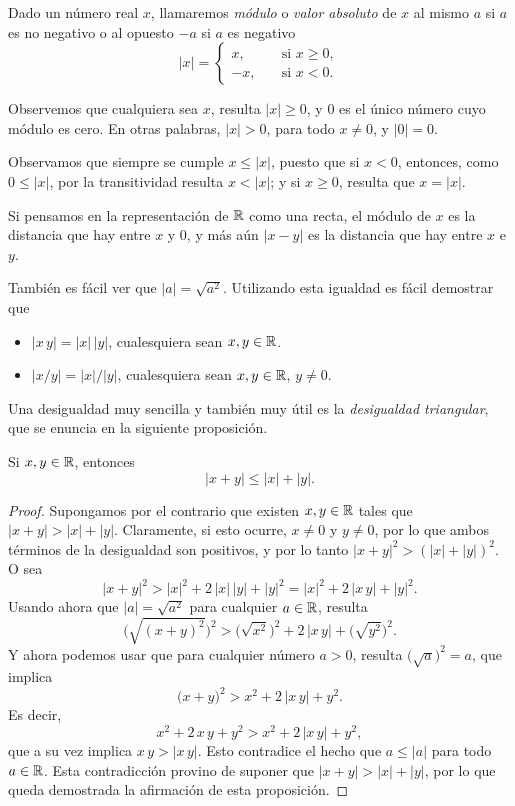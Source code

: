 \begin{definition}
    Dado un número real $x$, llamaremos \emph{módulo} o \emph{valor absoluto} de $x$ al mismo $a$ si $a$ es no negativo o al opuesto $-a$ si $a$ es negativo
    \[
        |x| = \begin{cases}
            x, \quad&\text{si }x\ge 0,\\
            -x, \quad&\text{si }x< 0.
        \end{cases}
    \]
\end{definition}

Observemos que cualquiera sea $x$, resulta $|x|\ge 0$, y $0$ es el único número cuyo módulo es cero. En otras palabras, $|x|>0$, para todo $x\neq 0$, y $|0|=0$.

Observamos que siempre se cumple $x \le |x|$, puesto que si $x < 0$, entonces, como 
$0\le |x|$, por la transitividad resulta $x < |x|$; y si $x \ge 0$, resulta que $x = |x|$.


Si pensamos en la representación de $\mathbb{R}$ como una recta, el módulo de $x$ es la distancia que hay entre $x$ y $0$, y más aún $|x-y|$ es la distancia que hay entre $x$ e $y$.

También es fácil ver que $|a|=\sqrt{a^2}$.
Utilizando esta igualdad es fácil demostrar que 
\begin{itemize}
    \item $|x\,y|=|x|\,|y|$, cualesquiera sean $x,y\in\mathbb{R}$.
    \item $|x/y|=|x|/|y|$, cualesquiera sean $x,y\in\mathbb{R}$, $y\neq 0$.
\end{itemize}

Una desigualdad muy sencilla y también muy útil es la \emph{desigualdad triangular}, que se enuncia en la siguiente proposición.

\begin{proposition}
    Si $x,y\in \mathbb{R}$, entonces 
    \[ |x+y| \le |x|+|y|.
    \]
\end{proposition}

\begin{proof}
    Supongamos por el contrario que existen $x,y\in \mathbb{R}$ tales que $|x+y|>|x|+|y|$.
    Claramente, si esto ocurre, $x\neq 0$ y $y\neq 0$, por lo que ambos términos de la desigualdad son positivos, 
    y por lo tanto $|x+y|^2>(|x|+|y|)^2$. O sea
    \[
        |x+y|^2 > |x|^2 + 2\,|x|\,|y| + |y|^2 = |x|^2 + 2\,|x\,y| + |y|^2 .
    \]
    Usando ahora que $|a|=\sqrt{a^2}$ para cualquier $a\in \mathbb{R}$, resulta
    \[
        \big(\sqrt{(x+y)^2}\big)^2 > \big(\sqrt{x^2}\big)^2 + 2\, |x\,y| + \big(\sqrt{y^2}\big)^2.
    \]
    Y ahora podemos usar que para cualquier número $a>0$, resulta $\big(\sqrt{a})^2 = a$, que implica
    \[
        \big(x+y\big)^2 > x^2 + 2\, |x\,y| + y^2.
    \]
    Es decir,
    \[
        x^2+ 2\,x\,y + y^2 > x^2 + 2\, |x\,y| + y^2,
    \]
    que a su vez implica $x\,y > |x\,y|$. Esto contradice el hecho que $a \le |a|$ para todo $a\in\mathbb{R}$.
    Esta contradicción provino de suponer que $|x+y|>|x|+|y|$, por lo que queda demostrada la afirmación de esta proposición.
\end{proof}

